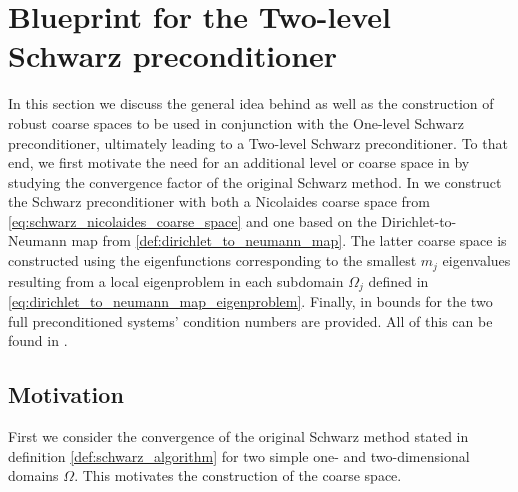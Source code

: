 \section{Blueprint for the Two-level Schwarz preconditioner}\label{sec:schwarz_convergence}
In this section we discuss the general idea behind as well as the construction of robust coarse spaces to be used in conjunction with the One-level Schwarz preconditioner, ultimately leading to a Two-level Schwarz preconditioner. To that end, we first motivate the need for an additional level or coarse space in  by studying the convergence factor of the original Schwarz method. In  we construct the Schwarz preconditioner with both a Nicolaides coarse space from \cref{eq:schwarz_nicolaides_coarse_space} and one based on the Dirichlet-to-Neumann map from \cref{def:dirichlet_to_neumann_map}. The latter coarse space is constructed using the eigenfunctions corresponding to the smallest $m_j$ eigenvalues resulting from a local eigenproblem in each subdomain $\Omega_j$ defined in \cref{eq:dirichlet_to_neumann_map_eigenproblem}. Finally, in  bounds for the two full preconditioned systems' condition numbers are provided. All of this can be found in \cite[Sections 5.1-5.5]{schwarz_methods_Dolean_2015}.

\subsection{Motivation}\label{sec:schwarz_motivation}
First we consider the convergence of the original Schwarz method stated in definition \ref{def:schwarz_algorithm} for two simple one- and two-dimensional domains $\Omega$. This motivates the construction of the coarse space.

